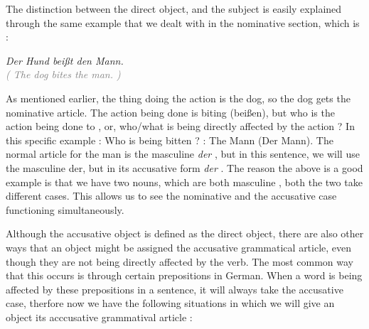 \documentclass[a4paper,twocolumn,10pt]{article}
\newcommand{\newpar}
{\par \vspace{0.3cm}}
\begin{document}
\vspace{0.5cm}

\linenumbers


The distinction between the direct object, and the subject is easily explained
through the same example that we dealt with in the nominative section, which is
:\newpar

\noindent
\textit{Der Hund beißt den Mann.}\\
\textcolor{gray} { \textit{( The dog bites the man. )} } \newpar

As mentioned earlier, the thing doing the action is the dog, so the dog gets the
nominative article. The action being done is biting (beißen), but who is the
action being done to , or, who/what is being directly affected by the action ?
In this specific example : Who is being bitten ? : The Mann (Der Mann). The
normal article for the man is the masculine \textit{der} , but in this sentence,
we will use the masculine der, but in its accusative form \textit{der} . The
reason the above is a good example is that we have two nouns, which are both
masculine , both the two take different cases. This allows us to see the
nominative and the accusative case functioning simultaneously.\newpar


Although the accusative object is defined as the direct object, there are also
other ways that an object might be assigned the accusative grammatical article,
even though they are not being directly affected by the verb. The most common
way that this occurs is through certain prepositions in German. When a word is
being affected by these prepositions in a sentence, it will always take the
accusative case, therfore now we have the following situations in which we will
give an object its acccusative grammatival article :\newpar
\end{document}
